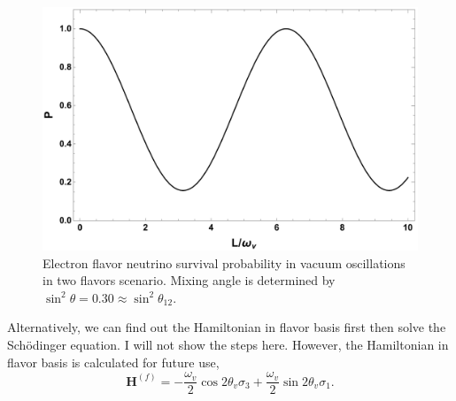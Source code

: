 \begin{figure}
    \centering
    \includegraphics[width=\textwidth]{chapters/assets/basics/neutrino-vaccum-osc-2-flavor.pdf}
    \caption{Electron flavor neutrino survival probability in vacuum oscillations in two flavors scenario. Mixing angle is determined by $\sin^2\theta=0.30 \approx \sin^2 \theta_{12}$.}
    \label{chap:basics-section:neutrinos-fig:vacuum-2-flavor-osc}
\end{figure}

Alternatively, we can find out the Hamiltonian in flavor basis first then solve the Sch\"{o}dinger equation. I will not show the steps here. However, the Hamiltonian in flavor basis is calculated for future use,
\begin{equation}
\mathbf H^{(f)} = -\frac{\omega_v}{2}\cos 2\theta_v \sigma_3 + \frac{\omega_v}{2} \sin 2\theta_v \sigma_1.
    \label{chap:basics-sec:vacuum-osc-eqn:hamiltonian-vacuum}
\end{equation}

